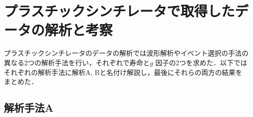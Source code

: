 







%


\section{プラスチックシンチレータで取得したデータの解析と考察}

プラスチックシンチレータのデータの解析では波形解析やイベント選択の手法の異なる2つの解析手法を行い，それぞれで寿命と$g$ 因子の2つを求めた．以下ではそれぞれの解析手法に解析A, Bと名付け解説し，最後にそれらの両方の結果をまとめた．
 
\subsection{解析手法A}
